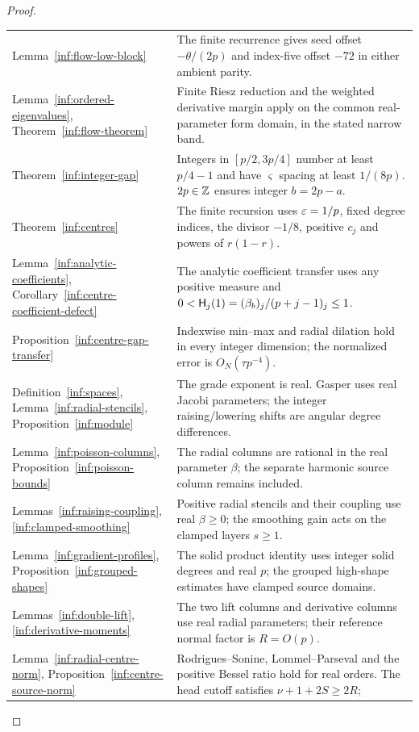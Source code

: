 \begin{proof}
\begin{longtable}{@{}>{\raggedright\arraybackslash}p{}>{\raggedright\arraybackslash}p{}@{}}
Lemma~\ref{inf:flow-low-block} &
The finite recurrence gives seed offset $-\theta/(2p)$ and
index-five offset $-72$ in either ambient parity.\\
Lemma~\ref{inf:ordered-eigenvalues}, Theorem~\ref{inf:flow-theorem} &
Finite Riesz reduction and the weighted derivative margin apply
on the common real-parameter form domain, in the stated narrow band.\\
Theorem~\ref{inf:integer-gap} &
Integers in $[p/2,3p/4]$ number at least $p/4-1$ and have
$\varsigma$ spacing at least $1/(8p)$.
$2p\in\mathbb{Z}$ ensures integer $b=2p-a$.\\
Theorem~\ref{inf:centres} &
The finite recursion uses $\varepsilon=1/p$, fixed degree indices,
the divisor $-1/8$, positive $c_j$ and powers of $r(1-r)$.\\
Lemma~\ref{inf:analytic-coefficients},
Corollary~\ref{inf:centre-coefficient-defect} &
The analytic coefficient transfer uses any positive measure and
$0<\mathsf H_j(1)=(\beta_b)_j/(p+j-1)_j\le1$.\\
Proposition~\ref{inf:centre-gap-transfer} &
Indexwise min--max and radial dilation hold in every integer dimension;
the normalized error is $O_N(\tau p^{-4})$.\\
Definition~\ref{inf:spaces}, Lemma~\ref{inf:radial-stencils},
Proposition~\ref{inf:module} &
The grade exponent is real. Gasper uses real Jacobi parameters;
the integer raising/lowering shifts are angular degree differences.\\
Lemma~\ref{inf:poisson-columns}, Proposition~\ref{inf:poisson-bounds} &
The radial columns are rational in the real parameter $\beta$;
the separate harmonic source column remains included.\\
Lemmas~\ref{inf:raising-coupling}, \ref{inf:clamped-smoothing} &
Positive radial stencils and their coupling use real $\beta\ge0$;
the smoothing gain acts on the clamped layers $s\ge1$.\\
Lemma~\ref{inf:gradient-profiles},
Proposition~\ref{inf:grouped-shapes} &
The solid product identity uses integer solid degrees and real $p$;
the grouped high-shape estimates have clamped source domains.\\
Lemmas~\ref{inf:double-lift}, \ref{inf:derivative-moments} &
The two lift columns and derivative columns use real radial
parameters; their reference normal factor is $R=O(p)$.\\
Lemma~\ref{inf:radial-centre-norm},
Proposition~\ref{inf:centre-source-norm} &
Rodrigues--Sonine, Lommel--Parseval and the positive Bessel ratio
hold for real orders. The head cutoff satisfies $\nu+1+2S\ge2R$;

\end{longtable}
\end{proof}
